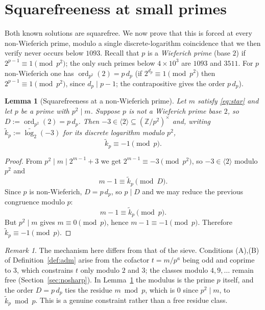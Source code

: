 \documentclass[11pt,reqno]{amsart}
\theoremstyle{plain}
\newtheorem{lemma}{Lemma}
\theoremstyle{definition}
\theoremstyle{remark}
\newtheorem{remark}{Remark}
\newcommand{\Z}{\mathbb{Z}}
\newcommand{\ord}{\operatorname{ord}}
\newcommand{\gen}[1]{\langle #1 \rangle}
\begin{document}
\section{Squarefreeness at small primes}\label{sec:sqfree}

Both known solutions are squarefree. We now prove that this is forced at every non-Wieferich
prime, modulo a single discrete-logarithm coincidence that we then verify never occurs below
$1093$. Recall that $p$ is a \emph{Wieferich prime} (base $2$) if $2^{p-1}\equiv 1\pmod{p^{2}}$;
the only such primes below $4\times 10^{3}$ are $1093$ and $3511$. For $p$ non-Wieferich one has
$\ord_{p^{2}}(2)=p\,d_{p}$ (if $2^{d_{p}}\equiv 1\pmod{p^{2}}$ then $2^{p-1}\equiv 1\pmod{p^{2}}$,
since $d_{p}\mid p-1$; the contrapositive gives the order $p\,d_{p}$).

\begin{lemma}[Squarefreeness at a non-Wieferich prime]\label{lem:sqfree}
Let $m$ satisfy \eqref{eq:star} and let $p$ be a prime with $p^{2}\mid m$. Suppose $p$ is not a
Wieferich prime base $2$, so $D:=\ord_{p^{2}}(2)=p\,d_{p}$. Then $-3\in\gen{2}\subseteq
(\Z/p^{2})^{\times}$ and, writing $\widetilde{k}_{p}:=\widetilde{\log_{2}}(-3)$ for its discrete
logarithm modulo $p^{2}$,
\[
\widetilde{k}_{p}\equiv -1\pmod{p}.
\]
\end{lemma}

\begin{proof}
From $p^{2}\mid m\mid 2^{m-1}+3$ we get $2^{m-1}\equiv-3\pmod{p^{2}}$, so $-3\in\gen{2}$ modulo
$p^{2}$ and
\[
m-1\equiv\widetilde{k}_{p}\pmod{D}.
\]
Since $p$ is non-Wieferich, $D=p\,d_{p}$, so $p\mid D$ and we may reduce the previous congruence
modulo $p$:
\[
m-1\equiv\widetilde{k}_{p}\pmod{p}.
\]
But $p^{2}\mid m$ gives $m\equiv 0\pmod p$, hence $m-1\equiv-1\pmod p$. Therefore
$\widetilde{k}_{p}\equiv-1\pmod p$.
\end{proof}

\begin{remark}
The mechanism here differs from that of the sieve. Conditions (A),(B) of
Definition~\ref{def:adm} arise from the cofactor $t=m/p^{a}$ being odd and coprime to $3$, which
constrains $t$ only modulo $2$ and $3$; the classes modulo $4,9,\dots$ remain free
(Section~\ref{sec:nosharp}). In Lemma~\ref{lem:sqfree} the modulus is the prime $p$ itself, and
the order $D=p\,d_{p}$ ties the residue $m\bmod p$, which is $0$ since $p^{2}\mid m$, to
$\widetilde{k}_{p}\bmod p$. This is a genuine constraint rather than a free residue class.
\end{remark}
\end{document}
